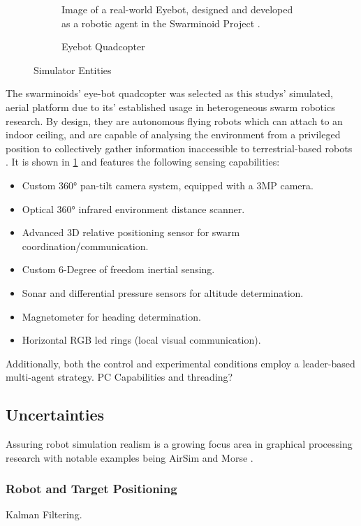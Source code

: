 \documentclass{report}
\begin{document}
\begin{figure}
\begin{subfigure}[b]{0.4\textwidth}
		\caption{Eyebot Quadcopter}
		\label{fig:eyebot_hardware}
		{Image of a real-world Eyebot, designed and developed as a robotic agent in the Swarminoid Project \cite{Dorigo2013}}.
	\end{subfigure}
	\caption{Simulator Entities}
	\label{fig:sim_orig}
\end{figure}

The swarminoids' \cite{Dorigo2013} eye-bot quadcopter was selected as this studys' simulated, aerial platform due to its' established usage in heterogeneous swarm robotics research. By design, they are autonomous flying robots which can attach to an indoor ceiling, and are capable of analysing the environment from a privileged position to collectively gather information inaccessible to terrestrial-based robots \cite{Dorigo2013}. It is shown in \ref{fig:eyebot_hardware} and features the following sensing capabilities:
\begin{itemize}
    \item Custom 360° pan-tilt camera system, equipped with a 3MP camera.
    \item Optical 360° infrared environment distance scanner.
    \item Advanced 3D relative positioning sensor for swarm coordination/communication.
    \item Custom 6-Degree of freedom inertial sensing.
    \item Sonar and differential pressure sensors for altitude determination.
    \item Magnetometer for heading determination.
    \item Horizontal RGB led rings (local visual communication).
\end{itemize}

Additionally, both the control and experimental conditions employ a leader-based multi-agent strategy. PC Capabilities and threading?

\subsection{Uncertainties}
Assuring robot simulation realism is a growing focus area in graphical processing research with notable examples being AirSim \cite{Shah} and Morse \cite{Morse2011}.

\subsubsection{Robot and Target Positioning}
Kalman Filtering.
\end{document}
